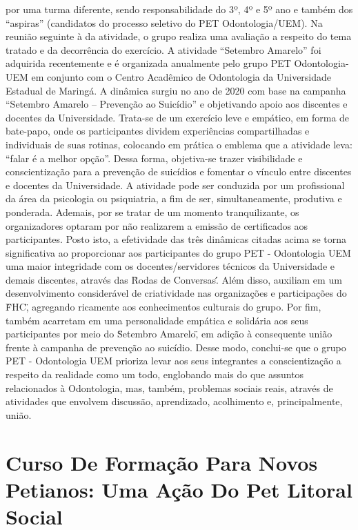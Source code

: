 por uma turma diferente, sendo responsabilidade do 3º, 4º e 5º ano e também dos “aspiras” (candidatos 
do processo seletivo do PET Odontologia/UEM). Na reunião seguinte à da atividade, o grupo realiza 
uma avaliação a respeito do tema tratado e da decorrência do exercício.
A atividade “Setembro Amarelo” foi adquirida recentemente e é organizada anualmente pelo grupo 
PET Odontologia-UEM em conjunto com o Centro Acadêmico de Odontologia da Universidade 
Estadual de Maringá. A dinâmica surgiu no ano de 2020 com base na campanha “Setembro Amarelo 
– Prevenção ao Suicídio” e objetivando apoio aos discentes e docentes da Universidade. Trata-se de 
um exercício leve e empático, em forma de bate-papo, onde os participantes dividem experiências 
compartilhadas e individuais de suas rotinas, colocando em prática o emblema que a atividade leva: 
“falar é a melhor opção”. Dessa forma, objetiva-se trazer visibilidade e conscientização para a 
prevenção de suicídios e fomentar o vínculo entre discentes e docentes da Universidade. A atividade 
pode ser conduzida por um profissional da área da psicologia ou psiquiatria, a fim de ser, 
simultaneamente, produtiva e ponderada. Ademais, por se tratar de um momento tranquilizante, os 
organizadores optaram por não realizarem a emissão de certificados aos participantes.
Posto isto, a efetividade das três dinâmicas citadas acima se torna significativa ao proporcionar aos 
participantes do grupo PET - Odontologia UEM uma maior integridade com os docentes/servidores 
técnicos da Universidade e demais discentes, através das \"Rodas de Conversas\'\'. Além disso, auxiliam 
em um desenvolvimento considerável de criatividade nas organizações e participações do \"FHC\", 
agregando ricamente aos conhecimentos culturais do grupo. Por fim, também acarretam em uma 
personalidade empática e solidária aos seus participantes por meio do \"Setembro Amarelo\", em adição 
à consequente união frente à campanha de prevenção ao suicídio.
Desse modo, conclui-se que o grupo PET - Odontologia UEM prioriza levar aos seus integrantes a 
conscientização a respeito da realidade como um todo, englobando mais do que assuntos relacionados 
à Odontologia, mas, também, problemas sociais reais, através de atividades que envolvem discussão, 
aprendizado, acolhimento e, principalmente, união.





\section*{Curso De Formação Para Novos Petianos: Uma Ação Do Pet Litoral  Social}

